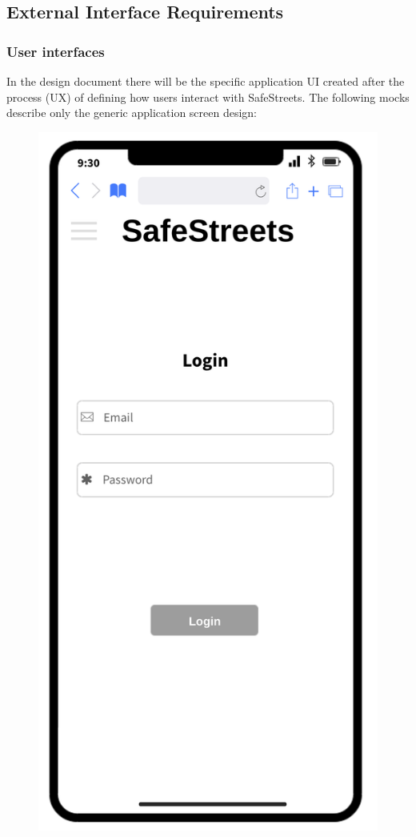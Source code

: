 
\subsection{External Interface Requirements}
\subsubsection{User interfaces}
In the design document there will be the specific application UI created after the process (UX) of defining how users interact with SafeStreets.
The following mocks describe only the generic application screen design:

	\begin{figure}[H]
		\centering
		\begin{minipage}[b]{0.40\textwidth}
			\includegraphics[width=\textwidth]{Images/rasd-mocks/login.png}

\end{minipage}
\end{figure}
